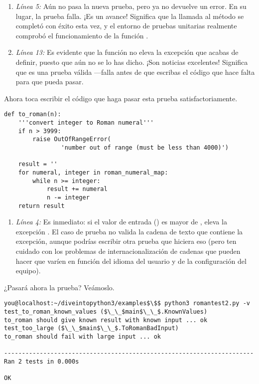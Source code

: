 \begin{enumerate}

\item \emph{Línea 5:} Aún no pasa la nueva prueba, pero ya no devuelve un error. En su lugar, la prueba falla. ¡Es un avance! Significa que la llamada al método  se completó con éxito esta vez, y el entorno de pruebas unitarias realmente comprobó el funcionamiento de la función .

\item \emph{Línea 13:} Es evidente que la función  no eleva la excepción  que acabas de definir, puesto que aún no se lo has dicho. ¡Son noticias excelentes! Significa que es una prueba válida ---falla antes de que escribas el código que hace falta para que pueda pasar.

\end{enumerate}

Ahora toca escribir el código que haga pasar esta prueba satisfactoriamente.

\noindent\begin{minipage}{\textwidth}
\begin{lstlisting}[mathescape=True]
def to_roman(n):
    '''convert integer to Roman numeral'''
    if n > 3999:
        raise OutOfRangeError(
                'number out of range (must be less than 4000)')

    result = ''
    for numeral, integer in roman_numeral_map:
        while n >= integer:
            result += numeral
            n -= integer
    return result
\end{lstlisting}
\end{minipage}

\begin{enumerate}

\item \emph{Línea 4:} Es inmediato: si el valor de entrada () es mayor de , eleva la excepción . El caso de prueba no valida la cadena de texto que contiene la excepción, aunque podrías escribir otra prueba que hiciera eso (pero ten cuidado con los problemas de internacionalización de cadenas que pueden hacer que varíen en función del idioma del usuario y de la configuración del equipo).

\end{enumerate}

¿Pasará ahora la prueba? Veámoslo.

\noindent\begin{minipage}{\textwidth}
\begin{lstlisting}[mathescape=True]
you@localhost:~/diveintopython3/examples$\$$ python3 romantest2.py -v
test_to_roman_known_values ($\_\_$main$\_\_$.KnownValues)
to_roman should give known result with known input ... ok
test_too_large ($\_\_$main$\_\_$.ToRomanBadInput)
to_roman should fail with large input ... ok 

----------------------------------------------------------------------
Ran 2 tests in 0.000s

OK
\end{lstlisting}
\end{minipage}

